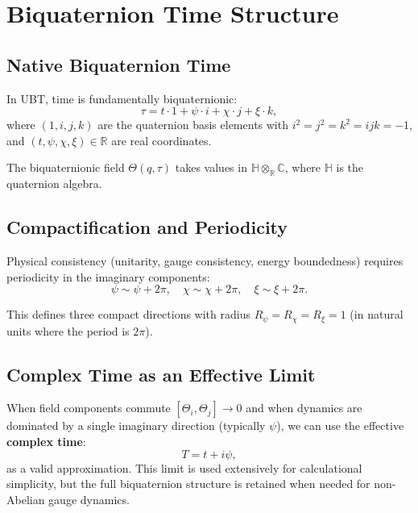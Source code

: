 \documentclass[11pt,a4paper]{article}
\theoremstyle{remark}
\begin{document}
\section{Biquaternion Time Structure}
\label{sec:biquat-time}

\subsection{Native Biquaternion Time}

In UBT, time is fundamentally biquaternionic:
\begin{equation}
\tau = t \cdot 1 + \psi \cdot i + \chi \cdot j + \xi \cdot k,
\label{eq:biquat-time}
\end{equation}
where $(1, i, j, k)$ are the quaternion basis elements with $i^2 = j^2 = k^2 = ijk = -1$, and $(t, \psi, \chi, \xi) \in \mathbb{R}$ are real coordinates.

The biquaternionic field $\Theta(q,\tau)$ takes values in $\mathbb{H} \otimes_\mathbb{R} \mathbb{C}$, where $\mathbb{H}$ is the quaternion algebra.

\subsection{Compactification and Periodicity}

Physical consistency (unitarity, gauge consistency, energy boundedness) requires periodicity in the imaginary components:
\begin{equation}
\psi \sim \psi + 2\pi, \quad \chi \sim \chi + 2\pi, \quad \xi \sim \xi + 2\pi.
\label{eq:periodicity}
\end{equation}

This defines three compact directions with radius $R_\psi = R_\chi = R_\xi = 1$ (in natural units where the period is $2\pi$).

\subsection{Complex Time as an Effective Limit}

When field components commute $[\Theta_i, \Theta_j] \to 0$ and when dynamics are dominated by a single imaginary direction (typically $\psi$), we can use the effective \textbf{complex time}:
\begin{equation}
T = t + i\psi,
\label{eq:complex-time-limit}
\end{equation}
as a valid approximation. This limit is used extensively for calculational simplicity, but the full biquaternion structure is retained when needed for non-Abelian gauge dynamics.
\end{document}
